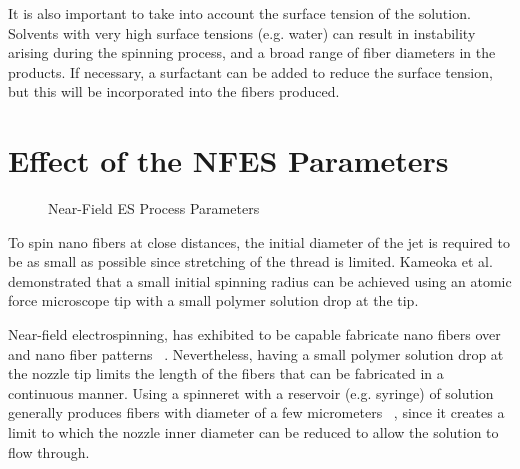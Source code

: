 \documentclass[5p,,preprint,12pt,twocolumn]{elsarticle}
\makeatletter
\def\fixFloatSize#1{}%
\makeatother
\begin{document}
It is also important to take into account the surface tension of the solution. Solvents with very high surface tensions (e.g. water) can result in instability arising during the spinning process, and a broad range of fiber diameters in the products. If necessary, a surfactant can be added to reduce the surface tension, but this will be incorporated into the fibers produced.
    
\section{Effect of the NFES Parameters}

\bgroup
\fixFloatSize{images/d29b646e-eca6-4b31-ab15-4cfc6fc94809-udrf_electrospinningvariants.jpg}
\begin{figure}[!htbp]
\centering \makeatletter{}
\makeatother 
\caption{{Near-Field ES Process Parameters}}
\label{f-3629d3a3f9cf}
\end{figure}
\egroup
To spin nano fibers at close distances, the initial diameter of the jet is required to be as small as possible since stretching of the thread is limited. Kameoka et al.\unskip~\cite{527120:12321556} demonstrated that a small initial spinning radius can be achieved using an atomic force microscope tip with a small polymer solution drop at the tip.

Near-field electrospinning, has exhibited to be capable fabricate nano fibers over and nano fiber patterns \unskip~\cite{527120:11974321}. Nevertheless, having a small polymer solution drop at the nozzle tip limits the length of the fibers that can be fabricated in a continuous manner. Using a spinneret with a reservoir (e.g. syringe) of solution generally produces fibers with diameter of a few micrometers \unskip~\cite{527120:11974310,527120:11974326}, since it creates a limit to which the nozzle inner diameter can be reduced to allow the solution to flow through.
\end{document}
